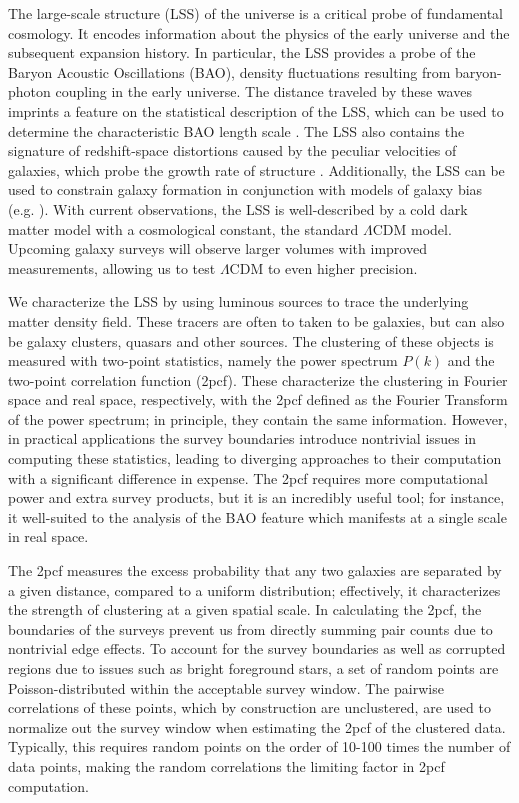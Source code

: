 \documentclass[modern]{aastex62}
\newcommand{\cf}{2pcf\xspace} %
\begin{document}
The large-scale structure (LSS) of the universe is a critical probe of fundamental cosmology. 
It encodes information about the physics of the early universe and the subsequent expansion history.
In particular, the LSS provides a probe of the Baryon Acoustic Oscillations (BAO), density fluctuations resulting from baryon-photon coupling in the early universe.
The distance traveled by these waves imprints a feature on the statistical description of the LSS, which can be used to determine the characteristic BAO length scale \citep{EisensteinHu1998}.
The LSS also contains the signature of redshift-space distortions caused by the peculiar velocities of galaxies, which probe the growth rate of structure \citep{Kaiser1987}.
Additionally, the LSS can be used to constrain galaxy formation in conjunction with models of galaxy bias (e.g. \citealt{Hamilton1988}). %
With current observations, the LSS is well-described by a cold dark matter model with a cosmological constant, the standard $\Lambda$CDM model.
Upcoming galaxy surveys will observe larger volumes with improved measurements, allowing us to test $\Lambda$CDM to even higher precision.

We characterize the LSS by using luminous sources to trace the underlying matter density field.
These tracers are often to taken to be galaxies, but can also be galaxy clusters, quasars and other sources.
The clustering of these objects is measured with two-point statistics, namely the power spectrum $P(k)$ and the two-point correlation function (\cf). %
These characterize the clustering in Fourier space and real space, respectively, with the \cf defined as the Fourier Transform of the power spectrum; in principle, they contain the same information. %
However, in practical applications the survey boundaries introduce nontrivial issues in computing these statistics, leading to diverging approaches to their computation with a significant difference in expense.
The \cf requires more computational power and extra survey products, but it is an incredibly useful tool; for instance, it well-suited to the analysis of the BAO feature which manifests at a single scale in real space.

The \cf measures the excess probability that any two galaxies are separated by a given distance, compared to a uniform distribution; effectively, it characterizes the strength of clustering at a given spatial scale. 
In calculating the \cf, the boundaries of the surveys prevent us from directly summing pair counts due to nontrivial edge effects.
To account for the survey boundaries as well as corrupted regions due to issues such as bright foreground stars, a set of random points are Poisson-distributed within the acceptable survey window. 
The pairwise correlations of these points, which by construction are unclustered, are used to normalize out the survey window when estimating the \cf of the clustered data.
Typically, this requires random points on the order of 10-100 times the number of data points, making the random correlations the limiting factor in \cf computation.
\end{document}
